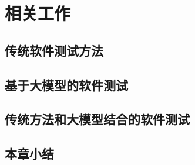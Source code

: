 \chapter{相关工作}
    \section{传统软件测试方法}
    \section{基于大模型的软件测试}
    \section{传统方法和大模型结合的软件测试}
    \section{本章小结}